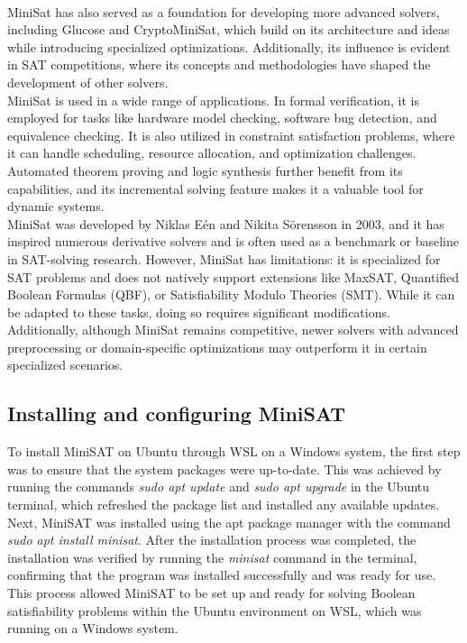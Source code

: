 \documentclass[runningheads]{llncs}
\begin{document}
\\
 MiniSat has also served as a foundation for developing more advanced solvers, including Glucose and CryptoMiniSat, which build on its architecture and ideas while introducing specialized optimizations. Additionally, its influence is evident in SAT competitions, where its concepts and methodologies have shaped the development of other solvers.
\\
MiniSat is used in a wide range of applications. In formal verification, it is employed for tasks like hardware model checking, software bug detection, and equivalence checking. It is also utilized in constraint satisfaction problems, where it can handle scheduling, resource allocation, and optimization challenges. Automated theorem proving and logic synthesis further benefit from its capabilities, and its incremental solving feature makes it a valuable tool for dynamic systems. 
\\
MiniSat was developed by Niklas Eén and Nikita Sörensson in 2003, and it has inspired numerous derivative solvers and is often used as a benchmark or baseline in SAT-solving research. However, MiniSat has limitations: it is specialized for SAT problems and does not natively support extensions like MaxSAT, Quantified Boolean Formulas (QBF), or Satisfiability Modulo Theories (SMT). While it can be adapted to these tasks, doing so requires significant modifications. Additionally, although MiniSat remains competitive, newer solvers with advanced preprocessing or domain-specific optimizations may outperform it in certain specialized scenarios.

\subsection{Installing and configuring MiniSAT}

To install MiniSAT on Ubuntu through WSL on a Windows system, the first step was to ensure that the system packages were up-to-date. This was achieved by running the commands \textit{sudo apt update} and \textit{sudo apt upgrade} in the Ubuntu terminal, which refreshed the package list and installed any available updates. Next, MiniSAT was installed using the apt package manager with the command \textit{sudo apt install minisat}. After the installation process was completed, the installation was verified by running the  \textit{minisat} command in the terminal, confirming that the program was installed successfully and was ready for use. This process allowed MiniSAT to be set up and ready for solving Boolean satisfiability problems within the Ubuntu environment on WSL, which was running on a Windows system. 
\end{document}
